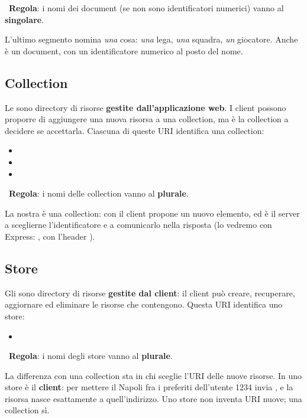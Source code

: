 \mok\ \textbf{Regola}: i nomi dei document (se non sono identificatori numerici)
vanno al \textbf{singolare}.

L'ultimo segmento nomina \textit{una} cosa: \textit{una} lega, \textit{una}
squadra, \textit{un} giocatore. Anche  è un document, con un
identificatore numerico al posto del nome.

\subsection{Collection}

Le  sono directory di risorse \textbf{gestite dall'applicazione
web}. I client possono proporre di aggiungere una nuova risorsa a una
collection, ma è la collection a decidere se accettarla. Ciascuna di queste URI
identifica una collection:

\begin{itemize}
  \item {}
  \item {}
  \item {}
\end{itemize}

\mok\ \textbf{Regola}: i nomi delle collection vanno al \textbf{plurale}.

La nostra  è una collection: con  il client
propone un nuovo elemento, ed è il server a sceglierne l'identificatore e a
comunicarlo nella risposta (lo vedremo con Express: , con
l'header ).

\subsection{Store}

Gli  sono directory di risorse \textbf{gestite dal client}: il
client può creare, recuperare, aggiornare ed eliminare le risorse che
contengono. Questa URI identifica uno store:

\begin{itemize}
  \item {}
\end{itemize}

\mok\ \textbf{Regola}: i nomi degli store vanno al \textbf{plurale}.

La differenza con una collection sta in chi sceglie l'URI delle nuove risorse.
In uno store è il \textbf{client}: per mettere il Napoli fra i preferiti
dell'utente 1234 invia , e la risorsa
nasce esattamente a quell'indirizzo. Uno store non inventa URI nuove; una
collection sì.

